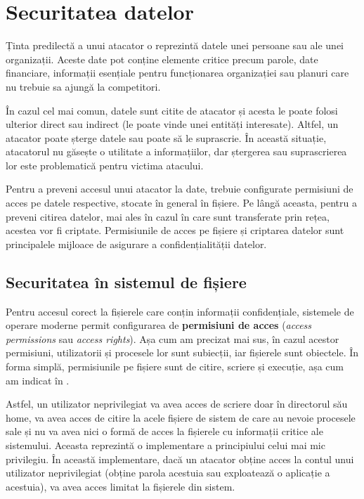 \section{Securitatea datelor}
\label{sec:sec:data}

Ținta predilectă a unui atacator o reprezintă datele unei persoane sau ale unei organizații.
Aceste date pot conține elemente critice precum parole, date financiare, informații esențiale pentru funcționarea organizației sau planuri care nu trebuie sa ajungă la competitori.

În cazul cel mai comun, datele sunt citite de atacator și acesta le poate folosi ulterior direct sau indirect (le poate vinde unei entități interesate).
Altfel, un atacator poate șterge datele sau poate să le suprascrie.
În această situație, atacatorul nu găsește o utilitate a informațiilor, dar ștergerea sau suprascrierea lor este problematică pentru victima atacului.

Pentru a preveni accesul unui atacator la date, trebuie configurate permisiuni de acces pe datele respective, stocate în general în fișiere.
Pe lângă aceasta, pentru a preveni citirea datelor, mai ales în cazul în care sunt transferate prin rețea, acestea vor fi criptate.
Permisiunile de acces pe fișiere și criptarea datelor sunt principalele mijloace de asigurare a confidențialității datelor.

\subsection{Securitatea în sistemul de fișiere}
\label{sec:sec:data:fs}

Pentru accesul corect la fișierele care conțin informații confidențiale, sistemele de operare moderne permit configurarea de \textbf{permisiuni de acces} (\textit{access permissions} sau \textit{access rights}).
Așa cum am precizat mai sus, în cazul acestor permisiuni, utilizatorii și procesele lor sunt subiecții, iar fișierele sunt obiectele.
În forma simplă, permisiunile pe fișiere sunt de citire, scriere și execuție, așa cum am indicat în .

Astfel, un utilizator neprivilegiat va avea acces de scriere doar în directorul său home, va avea acces de citire la acele fișiere de sistem de care au nevoie procesele sale și nu va avea nici o formă de acces la fișierele cu informații critice ale sistemului.
Aceasta reprezintă o implementare a principiului celui mai mic privilegiu.
În această implementare, dacă un atacator obține acces la contul unui utilizator neprivilegiat (obține parola acestuia sau exploatează o aplicație a acestuia), va avea acces limitat la fișierele din sistem.

